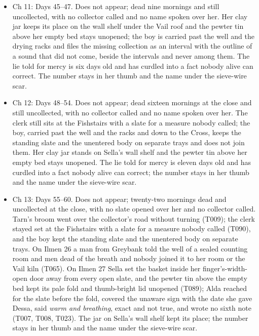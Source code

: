 \documentclass{design/chronicle}
\begin{document}
{\begin{itemize}[leftmargin=1.4em,itemsep=1pt,topsep=3pt,parsep=0pt]
\end{itemize}

\begin{itemize}[leftmargin=1.4em,itemsep=1pt,topsep=3pt,parsep=0pt]

\item Ch 11: Days 45–47. Does not appear; dead nine mornings and still uncollected, with no collector called and no name spoken over her. Her clay jar keeps its place on the wall shelf under the Vail roof and the pewter tin above her empty bed stays unopened; the boy is carried past the well and the drying racks and files the missing collection as an interval with the outline of a sound that did not come, beside the intervals and never among them. The lie told for mercy is six days old and has curdled into a fact nobody alive can correct. The number stays in her thumb and the name under the sieve-wire scar.

\end{itemize}

\begin{itemize}[leftmargin=1.4em,itemsep=1pt,topsep=3pt,parsep=0pt]

\item Ch 12: Days 48–54. Does not appear; dead sixteen mornings at the close and still uncollected, with no collector called and no name spoken over her. The clerk still sits at the Fishstairs with a slate for a measure nobody called; the boy, carried past the well and the racks and down to the Cross, keeps the standing slate and the unentered body on separate trays and does not join them. Her clay jar stands on Sella’s wall shelf and the pewter tin above her empty bed stays unopened. The lie told for mercy is eleven days old and has curdled into a fact nobody alive can correct; the number stays in her thumb and the name under the sieve-wire scar.

\end{itemize}

\begin{itemize}[leftmargin=1.4em,itemsep=1pt,topsep=3pt,parsep=0pt]

\item Ch 13: Days 55--60. Does not appear; twenty-two mornings dead and uncollected at the close, with no slate opened over her and no collector called. Tarn’s broom went over the collector’s road without turning (T009); the clerk stayed set at the Fishstairs with a slate for a measure nobody called (T090), and the boy kept the standing slate and the unentered body on separate trays. On Ilmen 26 a man from Greybank told the well of a sealed counting room and men dead of the breath and nobody joined it to her room or the Vail kiln (T065). On Ilmen 27 Sella set the basket inside her finger’s-width-open door away from every open slate, and the pewter tin above the empty bed kept its pale fold and thumb-bright lid unopened (T089); Alda reached for the slate before the fold, covered the unaware sign with the date she gave Dessa, said \emph{warm and breathing}, exact and not true, and wrote no sixth note (T007, T008, T023). The jar on Sella’s wall shelf kept its place; the number stays in her thumb and the name under the sieve-wire scar.


\end{itemize}}
\end{document}
